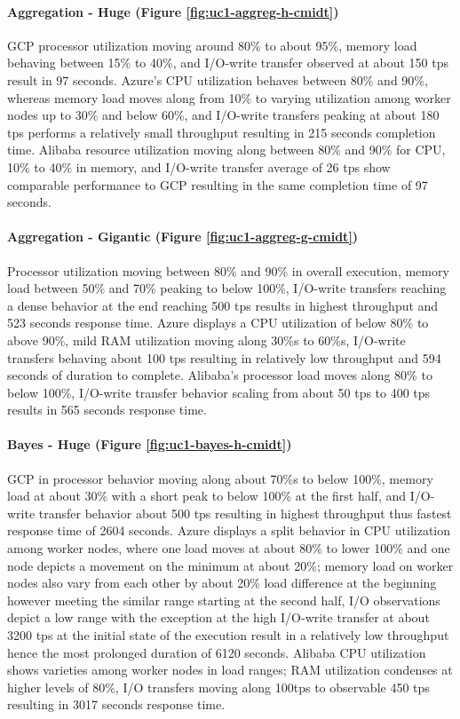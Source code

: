 \documentclass[review]{elsarticle}
\begin{document}
\paragraph{Aggregation - Huge (Figure \ref{fig:uc1-aggreg-h-cmidt})}GCP processor utilization moving around 80\% to about 95\%, memory load behaving between 15\% to 40\%, and I/O-write transfer observed at about 150 tps result in 97 seconds. Azure's CPU utilization behaves between 80\% and 90\%, whereas memory load moves along from 10\% to varying utilization among worker nodes up to 30\% and below 60\%, and I/O-write transfers peaking at about 180 tps performs a relatively small throughput resulting in 215 seconds completion time. Alibaba resource utilization moving along between 80\% and 90\% for CPU, 10\% to 40\% in memory, and I/O-write transfer average of 26 tps show comparable performance to GCP resulting in the same completion time of 97 seconds.

\paragraph{Aggregation - Gigantic (Figure \ref{fig:uc1-aggreg-g-cmidt})}Processor utilization moving between 80\% and 90\% in overall execution, memory load between 50\% and 70\% peaking to below 100\%, I/O-write transfers reaching a dense behavior at the end reaching 500 tps results in highest throughput and 523 seconds response time. Azure displays a CPU utilization of below 80\% to above 90\%, mild RAM utilization moving along 30\%s to 60\%s, I/O-write transfers behaving about 100 tps resulting in relatively low throughput and 594 seconds of duration to complete. Alibaba's processor load moves along 80\% to below 100\%, I/O-write transfer behavior scaling from about 50 tps to 400 tps results in 565 seconds response time.

\paragraph{Bayes - Huge (Figure \ref{fig:uc1-bayes-h-cmidt})}GCP in processor behavior moving along about 70\%s to below 100\%, memory load at about 30\% with a short peak to below 100\% at the first half, and I/O-write transfer behavior about 500 tps resulting in highest throughput thus fastest response time of 2604 seconds. Azure displays a split behavior in CPU utilization among worker nodes, where one load moves at about 80\% to lower 100\% and one node depicts a movement on the minimum at about 20\%; memory load on worker nodes also vary from each other by about 20\% load difference at the beginning however meeting the similar range starting at the second half, I/O observations depict a low range with the exception at the high I/O-write transfer at about 3200 tps at the initial state of the execution result in a relatively low throughput hence the most prolonged duration of 6120 seconds. Alibaba CPU utilization shows varieties among worker nodes in load ranges; RAM utilization condenses at higher levels of 80\%, I/O transfers moving along 100tps to observable 450 tps resulting in 3017 seconds response time.
\end{document}
